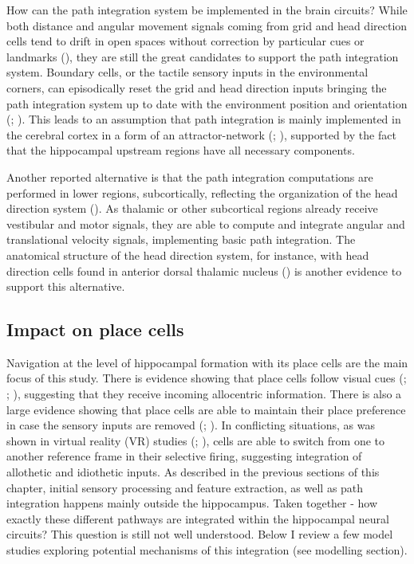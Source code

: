 How can the path integration system be implemented in the brain circuits? While both distance and angular movement signals coming from grid and head direction cells tend to drift in open spaces without correction by particular cues or landmarks (\cite{Barry2007}), they are still the great candidates to support the path integration system. Boundary cells, or the tactile sensory inputs in the environmental corners, can episodically reset the grid and head direction inputs bringing the path integration system up to date with the environment position and orientation (\cite{Barry2007}; \cite{Cheung2012}). This leads to an assumption that path integration is mainly implemented in the cerebral cortex in a form of an attractor-network (\cite{Knierim2012}; \cite{McNaughton2006}), supported by the fact that the hippocampal upstream regions have all necessary components.

Another reported alternative is that the path integration computations are performed in lower regions, subcortically, reflecting the organization of the head direction system (\cite{Savelli2019}). As thalamic or other subcortical regions already receive vestibular and motor signals, they are able to compute and integrate angular and translational velocity signals, implementing basic path integration. The anatomical structure of the head direction system, for instance, with head direction cells found in anterior dorsal thalamic nucleus (\cite{Taube1995}) is another evidence to support this alternative.


\subsection{Impact on place cells}

Navigation at the level of hippocampal formation with its place cells are the main focus of this study. There is evidence showing that place cells follow visual cues (\cite{Muller1987}; \cite{Deshmukh2013}; \cite{Aronov2014}), suggesting that they receive incoming allocentric information. There is also a large evidence showing that place cells are able to maintain their place preference in case the sensory inputs are removed (\cite{Gothard2001}; \cite{Quirk1990}). In conflicting situations, as was shown in virtual reality (VR) studies (\cite{Gothard2001}; \cite{Haas2019}), cells are able to switch from one to another reference frame in their selective firing, suggesting integration of allothetic and idiothetic inputs. As described in the previous sections of this chapter, initial sensory processing and feature extraction, as well as path integration happens mainly outside the hippocampus. Taken together - how exactly these different pathways are integrated within the hippocampal neural circuits? This question is still not well understood. Below I review a few model studies exploring potential mechanisms of this integration (see modelling section).


